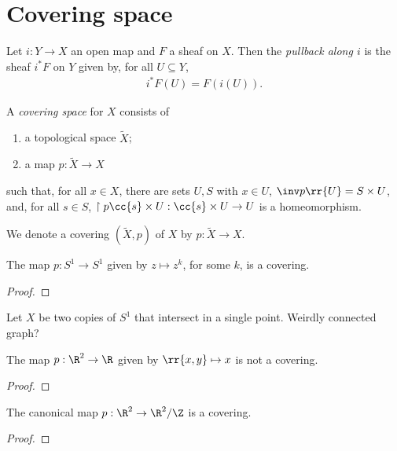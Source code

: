 \documentclass{article}
\begin{document}
\section{Covering space}\label{sec:covering_space}

\begin{definition}
  Let $i:Y\to X$ an open map and $F$ a sheaf on $X$. Then
  the \emph{pullback along $i$} is the sheaf $i^*F$ on $Y$
  given by, for all $U\subseteq Y$,
  \begin{align*}
    i^*F(U) = F(i(U)).
  \end{align*}
\end{definition}



\begin{definition}
  A \emph{covering space} for $X$ consists of
  \begin{enumerate}
    \item a topological space $\tilde X$;
    \item a map $p:\tilde X\to X$
  \end{enumerate}
  such that, for all $x\in X$, there are sets $U,S$ with $x\in U$, $\inv p\rr{U}=S\times U$,
  and, for all $s\in S$, $\restriction{p}{\cc{s}\times U}:\cc{s}\times U\to U$ is a
  homeomorphism.
\end{definition}

\begin{notation}
  We denote a covering $(\tilde X,p)$ of $X$ by $p:\tilde X\to X$.
\end{notation}

\begin{example}
  The map $p:S^1\to S^1$ given by $z\mapsto z^k$, for some $k$, is a covering.
  \begin{proof}
    \missingproof
  \end{proof}
\end{example}

\begin{example}
  Let $X$ be two copies of $S^1$ that intersect in a single point. Weirdly connected
  graph?
\end{example}

\begin{nonexample}
  The map $p:\R^2\to\R$ given by $\rr{x,y}\mapsto x$ is not a covering.
  \begin{proof}
    \missingproof
  \end{proof}
\end{nonexample}

\begin{example}
  The canonical map $p:\R^2\to\R^2/\Z$ is a covering.
  \begin{proof}
    \missingproof
  \end{proof}
\end{example}
\end{document}
